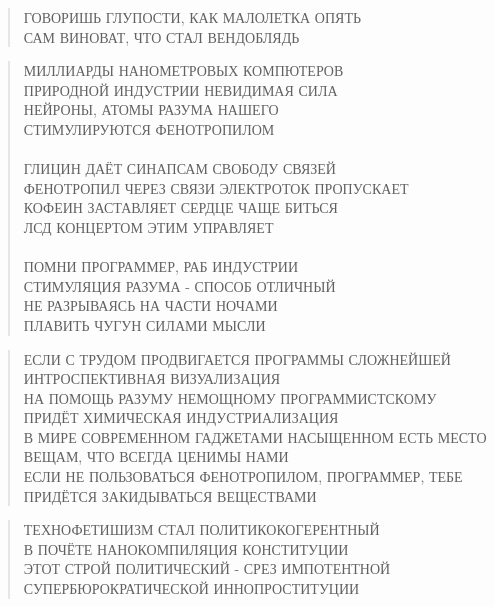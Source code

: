 \poemtitle{***}
\begin{verse}
ГОВОРИШЬ ГЛУПОСТИ, КАК МАЛОЛЕТКА ОПЯТЬ\\
САМ ВИНОВАТ, ЧТО СТАЛ ВЕНДОБЛЯДЬ
\end{verse}

\poemtitle{***}
\begin{verse}
МИЛЛИАРДЫ НАНОМЕТРОВЫХ КОМПЮТЕРОВ\\
    ПРИРОДНОЙ ИНДУСТРИИ НЕВИДИМАЯ СИЛА\\
НЕЙРОНЫ, АТОМЫ РАЗУМА НАШЕГО\\
    СТИМУЛИРУЮТСЯ ФЕНОТРОПИЛОМ\\
    \\
ГЛИЦИН ДАЁТ СИНАПСАМ СВОБОДУ СВЯЗЕЙ\\
    ФЕНОТРОПИЛ ЧЕРЕЗ СВЯЗИ ЭЛЕКТРОТОК ПРОПУСКАЕТ\\
КОФЕИН ЗАСТАВЛЯЕТ СЕРДЦЕ ЧАЩЕ БИТЬСЯ\\
    ЛСД КОНЦЕРТОМ ЭТИМ УПРАВЛЯЕТ\\
    \\
ПОМНИ ПРОГРАММЕР, РАБ ИНДУСТРИИ\\
    СТИМУЛЯЦИЯ РАЗУМА - СПОСОБ ОТЛИЧНЫЙ\\
НЕ РАЗРЫВАЯСЬ НА ЧАСТИ НОЧАМИ\\
    ПЛАВИТЬ ЧУГУН СИЛАМИ МЫСЛИ
\end{verse}

\poemtitle{***}
\begin{verse}
ЕСЛИ С ТРУДОМ ПРОДВИГАЕТСЯ ПРОГРАММЫ СЛОЖНЕЙШЕЙ ИНТРОСПЕКТИВНАЯ ВИЗУАЛИЗАЦИЯ\\
НА ПОМОЩЬ РАЗУМУ НЕМОЩНОМУ ПРОГРАММИСТСКОМУ ПРИДЁТ ХИМИЧЕСКАЯ ИНДУСТРИАЛИЗАЦИЯ\\
В МИРЕ СОВРЕМЕННОМ ГАДЖЕТАМИ НАСЫЩЕННОМ ЕСТЬ МЕСТО ВЕЩАМ, ЧТО ВСЕГДА ЦЕНИМЫ НАМИ\\
ЕСЛИ НЕ ПОЛЬЗОВАТЬСЯ ФЕНОТРОПИЛОМ, ПРОГРАММЕР, ТЕБЕ ПРИДЁТСЯ ЗАКИДЫВАТЬСЯ ВЕЩЕСТВАМИ
\end{verse}

\poemtitle{***}
\begin{verse}
ТЕХНОФЕТИШИЗМ СТАЛ ПОЛИТИКОКОГЕРЕНТНЫЙ\\
В ПОЧЁТЕ НАНОКОМПИЛЯЦИЯ КОНСТИТУЦИИ\\
ЭТОТ СТРОЙ ПОЛИТИЧЕСКИЙ - СРЕЗ ИМПОТЕНТНОЙ\\
СУПЕРБЮРОКРАТИЧЕСКОЙ ИННОПРОСТИТУЦИИ
\end{verse}

